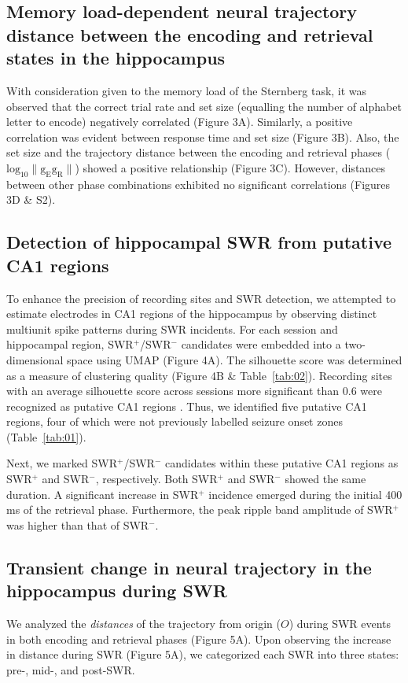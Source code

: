 \subsection{Memory load-dependent neural trajectory distance between the encoding and retrieval states in the hippocampus}
With consideration given to the memory load of the Sternberg task, it was observed that the correct trial rate and set size (equalling the number of alphabet letter to encode) negatively correlated (Figure 3A). Similarly, a positive correlation was evident between response time and set size (Figure 3B). Also, the set size and the trajectory distance between the encoding and retrieval phases ($\mathrm{log_{10}\lVert g_{E}g_{R} \rVert}$) showed a positive relationship (Figure 3C). However, distances between other phase combinations exhibited no significant correlations (Figures 3D \& S2).

\subsection{Detection of hippocampal SWR from putative CA1 regions}
To enhance the precision of recording sites and SWR detection, we attempted to estimate electrodes in CA1 regions of the hippocampus by observing distinct multiunit spike patterns during SWR incidents. For each session and hippocampal region, SWR$^+$/SWR$^-$ candidates were embedded into a two-dimensional space using UMAP (Figure 4A). The silhouette score was determined as a measure of clustering quality (Figure 4B \& Table~\ref{tab:02}). Recording sites with an average silhouette score across sessions more significant than 0.6 were recognized as putative CA1 regions \cite{mcinnes_umap_2018, rousseeuw_silhouettes_1987}. Thus, we identified five putative CA1 regions, four of which were not previously labelled seizure onset zones (Table~\ref{tab:01}).

Next, we marked SWR$^+$/SWR$^-$ candidates within these putative CA1 regions as SWR$^+$ and SWR$^-$, respectively. Both SWR$^+$ and SWR$^-$ showed the same duration. A significant increase in SWR$^+$ incidence emerged during the initial 400 ms of the retrieval phase. Furthermore, the peak ripple band amplitude of SWR$^+$ was higher than that of SWR$^-$.

\subsection{Transient change in neural trajectory in the hippocampus during SWR}
We analyzed the \textit{distances} of the trajectory from origin ($O$) during SWR events in both encoding and retrieval phases (Figure 5A). Upon observing the increase in distance during SWR (Figure 5A), we categorized each SWR into three states: pre-, mid-, and post-SWR. 

